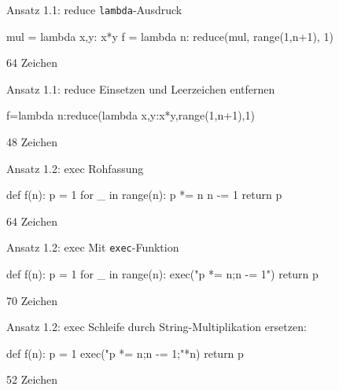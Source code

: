 \documentclass[xcolor=dvipsnames, aspectratio=43, 14pt]{beamer}
\begin{document}
\begin{frame}[fragile]{Ansatz 1.1: reduce}
	\texttt{lambda}-Ausdruck
	
	\vfill
	
	\begin{python3code}
	mul = lambda x,y: x*y
	f = lambda n: reduce(mul, range(1,n+1), 1)
	\end{python3code}
	
	\vfill
	
	64 Zeichen
\end{frame}

\begin{frame}[fragile]{Ansatz 1.1: reduce}
	Einsetzen und Leerzeichen entfernen
	
	\vfill
	
	\begin{python3code}
	f=lambda n:reduce(lambda x,y:x*y,range(1,n+1),1)
	\end{python3code}
	
	\vfill
	
	48 Zeichen
\end{frame}

\begin{frame}[fragile]{Ansatz 1.2: exec}
	Rohfassung
	
	\vfill
	
	\begin{python3code}
	def f(n):
	   p = 1
	   for _ in range(n):
	      p *= n
	      n -= 1
	   return p
	\end{python3code}
	
	\vfill
	
	64 Zeichen
\end{frame}

\begin{frame}[fragile]{Ansatz 1.2: exec}
	Mit \texttt{exec}-Funktion
	
	\vfill
	
	\begin{python3code}
	def f(n):
	   p = 1
	   for _ in range(n):
	      exec("p *= n;n -= 1")
	   return p
	\end{python3code}
	
	\vfill
	
	70 Zeichen
\end{frame}

\begin{frame}[fragile]{Ansatz 1.2: exec}
	Schleife durch String-Multiplikation ersetzen:
	
	\vfill
	
	\begin{python3code}
	def f(n):
	   p = 1
	   exec("p *= n;n -= 1;"*n)
	   return p
	\end{python3code}
	
	\vfill
	
	52 Zeichen
\end{frame}
\end{document}
